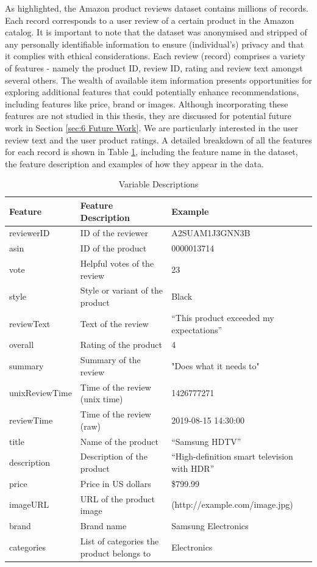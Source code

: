 As highlighted, the Amazon product reviews dataset contains millions of records. Each record corresponds to a user review of a certain product in the Amazon catalog. It is important to note that the dataset was anonymised and stripped of any personally identifiable information to ensure (individual's) privacy and that it complies with ethical considerations. Each review (record) comprises a variety of features - namely the product ID, review ID, rating and review text amongst several others. The wealth of available item information presents opportunities for exploring  additional features that could potentially enhance recommendations, including features like price, brand or images. Although incorporating these features are not studied in this thesis, they are discussed for potential future work in Section \ref{sec:6 Future Work}. We are particularly interested in the user review text and the user product ratings. A detailed breakdown of all the features for each record is shown in Table \ref{tab:variable_description}, including the feature name in the dataset, the feature description and examples of how they appear in the data.

\begin{table}[h]
  \centering
  \begin{tabular}{|p{3cm}|p{5cm}|p{6cm}|}
  \hline
  \textbf{Feature} & \textbf{Feature Description} & \textbf{Example} \\
  \hline
  reviewerID & ID of the reviewer & A2SUAM1J3GNN3B \\
  \hline
  asin & ID of the product & 0000013714 \\
  \hline
  vote & Helpful votes of the review & 23 \\
  \hline
  style & Style or variant of the product & Black \\
  \hline
  reviewText & Text of the review & “This product exceeded my expectations” \\
  \hline
  overall & Rating of the product & 4 \\
  \hline
  summary & Summary of the review & "Does what it needs to" \\
  \hline
  unixReviewTime & Time of the review (unix time) & 1426777271 \\
  \hline
  reviewTime & Time of the review (raw) & 2019-08-15 14:30:00 \\
  \hline
  title & Name of the product & “Samsung HDTV” \\
  \hline
  description & Description of the product & “High-definition smart television with HDR” \\
  \hline
  price & Price in US dollars & \$799.99 \\
  \hline
  imageURL & URL of the product image & (http://example.com/image.jpg) \\
  \hline
  brand & Brand name & Samsung Electronics \\
  \hline
  categories & List of categories the product belongs to & Electronics \\
  \hline
  \end{tabular}
  \caption{Variable Descriptions}
  \label{tab:variable_description}
  \end{table}
  
